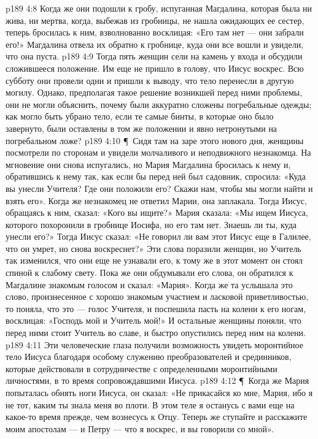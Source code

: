 \vs p189 4:8 Когда же они подошли к гробу, испуганная Магдалина, которая была ни жива, ни мертва, когда, выбежав из гробницы, не нашла ожидающих ее сестер, теперь бросилась к ним, взволнованно восклицая: «Его там нет --- они забрали его!» Магдалина отвела их обратно к гробнице, куда они все вошли и увидели, что она пуста.
\vs p189 4:9 Тогда пять женщин сели на камень у входа и обсудили сложившееся положение. Им еще не пришло в голову, что Иисус воскрес. Всю субботу они провели одни и пришли к выводу, что тело перенесли в другую могилу. Однако, предполагая такое решение возникшей перед ними проблемы, они не могли объяснить, почему были аккуратно сложены погребальные одежды; как могло быть убрано тело, если те самые бинты, в которые оно было завернуто, были оставлены в том же положении и явно нетронутыми на погребальном ложе?
\vs p189 4:10 \P\ Сидя там на заре этого нового дня, женщины посмотрели по сторонам и увидели молчаливого и неподвижного незнакомца. На мгновение они снова испугались, но Мария Магдалина бросилась к нему и, обратившись к нему так, как если бы перед ней был садовник, спросила: «Куда вы унесли Учителя? Где они положили его? Скажи нам, чтобы мы могли найти и взять его». Когда же незнакомец не ответил Марии, она заплакала. Тогда Иисус, обращаясь к ним, сказал: «Кого вы ищите?» Мария сказала: «Мы ищем Иисуса, которого похоронили в гробнице Иосифа, но его там нет. Знаешь ли ты, куда унесли его?» Тогда Иисус сказал: «Не говорил ли вам этот Иисус еще в Галилее, что он умрет, но снова воскреснет?» Эти слова поразили женщин, но Учитель так изменился, что они еще не узнавали его, к тому же в этот момент он стоял спиной к слабому свету. Пока же они обдумывали его слова, он обратился к Магдалине знакомым голосом и сказал: «Мария». Когда же та услышала это слово, произнесенное с хорошо знакомым участием и ласковой приветливостью, то поняла, что это --- голос Учителя, и поспешила пасть на колени к его ногам, восклицая: «Господь мой и Учитель мой!» И остальные женщины поняли, что перед ними стоит Учитель во славе, и быстро опустились перед ним на колени.
\vs p189 4:11 Эти человеческие глаза получили возможность увидеть моронтийное тело Иисуса благодаря особому служению преобразователей и срединников, которые действовали в сотрудничестве с определенными моронтийными личностями, в то время сопровождавшими Иисуса.
\vs p189 4:12 \P\ Когда же Мария попыталась обнять ноги Иисуса, он сказал: «Не прикасайся ко мне, Мария, ибо я не тот, каким ты знала меня во плоти. В этом теле я останусь с вами еще на какое\hyp{}то время прежде, чем вознесусь к Отцу. Теперь же ступайте и расскажите моим апостолам --- и Петру --- что я воскрес, и вы говорили со мной».
